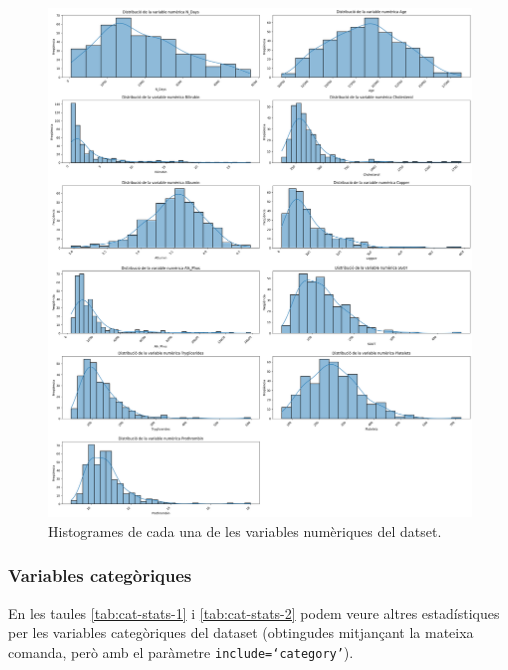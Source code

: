 \begin{figure}
    \centering
    \includegraphics[width=\linewidth]{img/num-histograms.png}
    \caption{Histogrames de cada una de les variables numèriques del datset.}
    \label{fig:num-histograms-1}
\end{figure}

\subsubsection{Variables categòriques}
En les taules \ref{tab:cat-stats-1} i \ref{tab:cat-stats-2} podem veure altres estadístiques per les variables categòriques del dataset (obtingudes mitjançant la mateixa comanda, però amb el paràmetre \texttt{include=`category'}).

